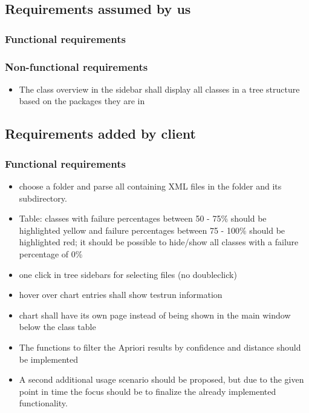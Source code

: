 \subsection{Requirements assumed by us}
\subsubsection{Functional requirements}

\subsubsection{Non-functional requirements}
\begin{itemize}
\item The class overview in the sidebar shall display all classes in a tree structure based on the packages they are in
\end{itemize}
\subsection{Requirements added by client}
\subsubsection{Functional requirements}

\begin{itemize}

\item choose a folder and parse all containing XML files in the folder and its subdirectory.

\item Table: classes with failure percentages between 50 - 75\% should be highlighted yellow and failure percentages between 75 - 100\% should be highlighted red; it should be possible to hide/show all classes with a failure percentage of 0\%

\item one click in tree sidebars for selecting files (no doubleclick)
\item hover over chart entries shall show testrun information
\item chart shall have its own page instead of being shown in the main window below the class table
\item The functions to filter the Apriori results by confidence and distance should be implemented

\item A second additional usage scenario should be proposed, but due to the given point in time the focus should be to finalize the already implemented functionality.

\end{itemize}

